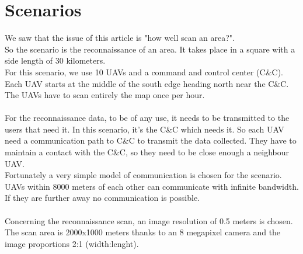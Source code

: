 \chapter{Scenarios}

We saw that the issue of this article is "how well scan an area?".\\
So the scenario is the reconnaissance of an area. It takes place in a square with a side length of 30 kilometers.\\
For this scenario, we use 10 UAVs and a command and control center (C\&C). Each UAV starts at the middle of the south edge heading north near the C\&C.
The UAVs have to scan entirely the map once per hour. \\\\

For the reconnaissance data, to be of any use, it needs to be transmitted to the users that need it. In this scenario, it's the C\&C which needs it. So each UAV need a communication path to C\&C to transmit the data collected. They have to maintain a contact with the C\&C, so they need to be close enough a neighbour UAV.\\
Fortunately a very simple model of communication is chosen for the scenario.  UAVs  within 8000  meters  of  each  other  can  communicate  with infinite  bandwidth.  If  they  are  further  away  no communication  is  possible.\\\\

Concerning the reconnaissance scan, an image resolution of 0.5 meters is chosen. The scan area is 2000x1000 meters thanks to an 8 megapixel camera and the image proportions 2:1 (width:lenght).